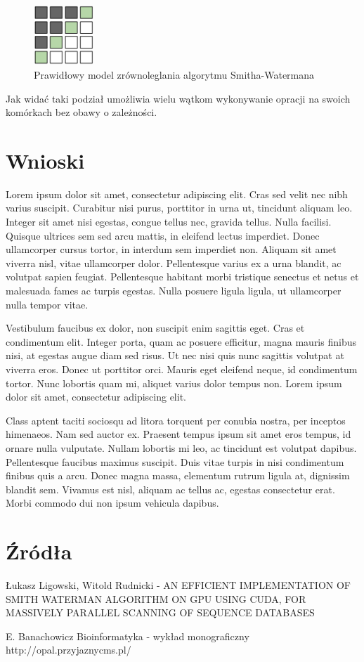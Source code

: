 \documentclass[a4paper,12pt]{article}
\begin{document}
\begin{figure}[H]
  \vspace{5pt}
  \centering
  \begin{center}
  \includegraphics[width=0.2\textwidth]{images/DobryModelZrownoleglenia.png}
  \end{center}
  \caption{Prawidłowy model zrównoleglania algorytmu Smitha-Watermana}
 \end{figure}

Jak widać taki podział umożliwia wielu wątkom wykonywanie opracji na swoich komórkach bez obawy o zależności. 


\section*{Wnioski}
Lorem ipsum dolor sit amet, consectetur adipiscing elit. Cras sed velit nec nibh varius suscipit. Curabitur nisi purus, porttitor in urna ut, tincidunt aliquam leo. Integer sit amet nisi egestas, congue tellus nec, gravida tellus. Nulla facilisi. Quisque ultrices sem sed arcu mattis, in eleifend lectus imperdiet. Donec ullamcorper cursus tortor, in interdum sem imperdiet non. Aliquam sit amet viverra nisl, vitae ullamcorper dolor. Pellentesque varius ex a urna blandit, ac volutpat sapien feugiat. Pellentesque habitant morbi tristique senectus et netus et malesuada fames ac turpis egestas. Nulla posuere ligula ligula, ut ullamcorper nulla tempor vitae.

Vestibulum faucibus ex dolor, non suscipit enim sagittis eget. Cras et condimentum elit. Integer porta, quam ac posuere efficitur, magna mauris finibus nisi, at egestas augue diam sed risus. Ut nec nisi quis nunc sagittis volutpat at viverra eros. Donec ut porttitor orci. Mauris eget eleifend neque, id condimentum tortor. Nunc lobortis quam mi, aliquet varius dolor tempus non. Lorem ipsum dolor sit amet, consectetur adipiscing elit.

Class aptent taciti sociosqu ad litora torquent per conubia nostra, per inceptos himenaeos. Nam sed auctor ex. Praesent tempus ipsum sit amet eros tempus, id ornare nulla vulputate. Nullam lobortis mi leo, ac tincidunt est volutpat dapibus. Pellentesque faucibus maximus suscipit. Duis vitae turpis in nisi condimentum finibus quis a arcu. Donec magna massa, elementum rutrum ligula at, dignissim blandit sem. Vivamus est nisl, aliquam ac tellus ac, egestas consectetur erat. Morbi commodo dui non ipsum vehicula dapibus.

\section*{Źródła}
Łukasz Ligowski, Witold Rudnicki - AN EFFICIENT IMPLEMENTATION OF SMITH WATERMAN ALGORITHM ON GPU USING CUDA, FOR MASSIVELY PARALLEL SCANNING OF SEQUENCE DATABASES

E. Banachowicz Bioinformatyka - wykład monograficzny 
http://opal.przyjaznycms.pl/
\end{document}
